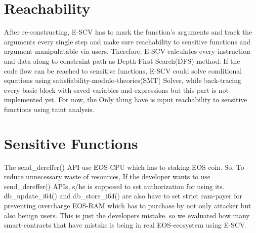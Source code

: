 \section{Reachability}
After re-constructing, E-SCV has to mark the function's arguments and track the arguments every single step and make sure reachability to sensitive functions and argument manipulatable via users. Therefore, E-SCV calculates every instruction and data along to constraint-path as Depth First Search(DFS) method. If the code flow can be reached to sensitive functions, E-SCV could solve conditional equations using satisfiability-modulo-theories(SMT) Solver, while back-tracing every basic block with saved variables and expressions but this part is not implemented yet. For now, the Only thing have is input reachability to sensitive functions using taint analysis.


\section{Sensitive Functions}
The send\_dereffer() API use EOS-CPU which has to staking EOS coin. So, To reduce unnecessary waste of resources, If the developer wants to use send\_dereffer() APIs, s/he is supposed to set authorization for using its. db\_update\_i64() and db\_store\_i64() are also have to set strict ram-payer for preventing overcharge EOS-RAM which has to purchase by not only attacker but also benign users. This is just the developers mistake. so we evaluated how many smart-contracts that have mistake is being in real EOS-ecosystem using E-SCV.

